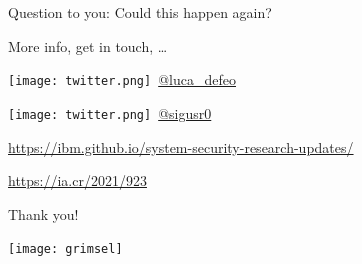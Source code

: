 \documentclass[aspectratio=169]{beamer}
\begin{document}

\begin{frame}{Question to you:}
  \LARGE\centering
  Could this happen again?
\end{frame}


\begin{frame}{More info, get in touch, \dots}
  \large\centering
  
  \begin{description}
    \setlength{\itemsep}{2em}
  \item[Luca:]
    \texttt{[image: twitter.png]}~\href{https://twitter.com/luca_defeo}{@luca\_defeo}
  \item[Ale:]
    \texttt{[image: twitter.png]}~\href{https://twitter.com/sigusr0}{@sigusr0}
  
  \item[Blog:]
    \url{https://ibm.github.io/system-security-research-updates/}
  
  \item[Paper:]
    \url{https://ia.cr/2021/923}
  \end{description}
  
  \Huge\vfill
  Thank you!
\end{frame}


{
  \begin{frame}[plain]
    \centering
    \texttt{[image: grimsel]}
  \end{frame}
}
\end{document}
